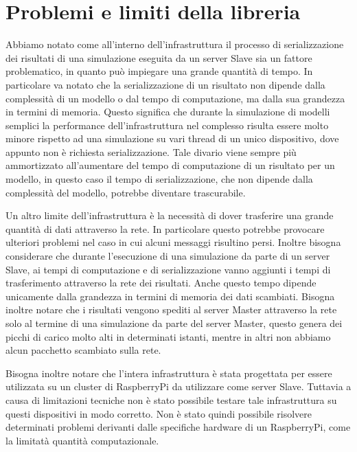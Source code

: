 \section{Problemi e limiti della libreria}

Abbiamo notato come all'interno dell'infrastruttura il processo di serializzazione dei risultati di una simulazione eseguita da un server Slave sia un fattore problematico, in quanto può impiegare una grande quantità di tempo. 
In particolare va notato che la serializzazione di un risultato non dipende dalla complessità di un modello o dal tempo di computazione, ma dalla sua grandezza in termini di memoria. 
Questo significa che durante la simulazione di modelli semplici la performance dell'infrastruttura nel complesso risulta essere molto minore rispetto ad una simulazione su vari thread di un unico dispositivo, dove appunto non è richiesta serializzazione. 
Tale divario viene sempre più ammortizzato all'aumentare del tempo di computazione di un risultato per un modello, in questo caso il tempo di serializzazione, che non dipende dalla complessità del modello, potrebbe diventare trascurabile.

Un altro limite dell'infrastruttura è la necessità di dover trasferire una grande quantità di dati attraverso la rete. 
In particolare questo potrebbe provocare ulteriori problemi nel caso in cui alcuni messaggi risultino persi. Inoltre bisogna considerare che durante l'esecuzione di una simulazione da parte di un server Slave, ai tempi di computazione e di serializzazione vanno aggiunti i tempi di trasferimento attraverso la rete dei risultati. 
Anche questo tempo dipende unicamente dalla grandezza in termini di memoria dei dati scambiati.    
Bisogna inoltre notare che i risultati vengono spediti al server Master attraverso la rete solo al termine di una simulazione da parte del server Master, questo genera dei picchi di carico molto alti in determinati istanti, mentre in altri non abbiamo alcun pacchetto scambiato sulla rete.

Bisogna inoltre notare che l'intera infrastruttura è stata progettata per essere utilizzata su un cluster di RaspberryPi da utilizzare come server Slave. 
Tuttavia a causa di limitazioni tecniche non è stato possibile testare tale infrastruttura su questi dispositivi in modo corretto. 
Non è stato quindi possibile risolvere determinati problemi derivanti dalle specifiche hardware di un RaspberryPi, come la limitatà quantità computazionale.